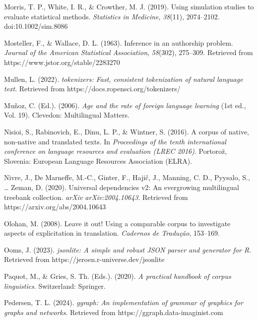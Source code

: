\documentclass[
  letterpaper,
  krantz1]{latex/krantz-mod}
\newlength{\cslhangindent}
\newenvironment{CSLReferences}[2] %
 {\begin{list}{}{%
  \setlength{\itemindent}{0pt}
  \setlength{\leftmargin}{0pt}
  \setlength{\parsep}{0pt}
  \ifodd #1
   \setlength{\leftmargin}{\cslhangindent}
   \setlength{\itemindent}{-1\cslhangindent}
  \fi
  \setlength{\itemsep}{#2\baselineskip}}}
 {\end{list}}
\theoremstyle{definition}
\theoremstyle{definition}
\theoremstyle{remark}
\begin{document}
\begin{CSLReferences}{1}{0}
Morris, T. P., White, I. R., \& Crowther, M. J. (2019). Using simulation
studies to evaluate statistical methods. \emph{Statistics in Medicine},
\emph{38}(11), 2074--2102. doi:10.1002/sim.8086

Mosteller, F., \& Wallace, D. L. (1963). Inference in an authorship
problem. \emph{Journal of the American Statistical Association},
\emph{58}(302), 275--309. Retrieved from
https://www.jstor.org/stable/2283270

Mullen, L. (2022). \emph{{tokenizers}: Fast, consistent tokenization of
natural language text}. Retrieved from
https://docs.ropensci.org/tokenizers/

Muñoz, C. (Ed.). (2006). \emph{Age and the rate of foreign language
learning} (1st ed., Vol. 19). Clevedon: Multilingual Matters.

Nisioi, S., Rabinovich, E., Dinu, L. P., \& Wintner, S. (2016). A corpus
of native, non-native and translated texts. In \emph{Proceedings of the
tenth international conference on language resources and evaluation
({LREC} 2016)}. Portoro{z̆}, Slovenia: European Language Resources
Association (ELRA).

Nivre, J., De Marneffe, M.-C., Ginter, F., Hajič, J., Manning, C. D.,
Pyysalo, S., \ldots{} Zeman, D. (2020). Universal dependencies v2: {An}
evergrowing multilingual treebank collection. \emph{arXiv
arXiv:2004.10643}. Retrieved from https://arxiv.org/abs/2004.10643

Olohan, M. (2008). Leave it out! {Using} a comparable corpus to
investigate aspects of explicitation in translation. \emph{Cadernos de
Tradu{ç}{ã}o}, 153--169.

Ooms, J. (2023). \emph{{jsonlite}: A simple and robust {JSON} parser and
generator for {R}}. Retrieved from
https://jeroen.r-universe.dev/jsonlite

Paquot, M., \& Gries, S. Th. (Eds.). (2020). \emph{A practical handbook
of corpus linguistics}. Switzerland: Springer.

Pedersen, T. L. (2024). \emph{{ggraph}: An implementation of grammar of
graphics for graphs and networks}. Retrieved from
https://ggraph.data-imaginist.com


\end{CSLReferences}
\end{document}
